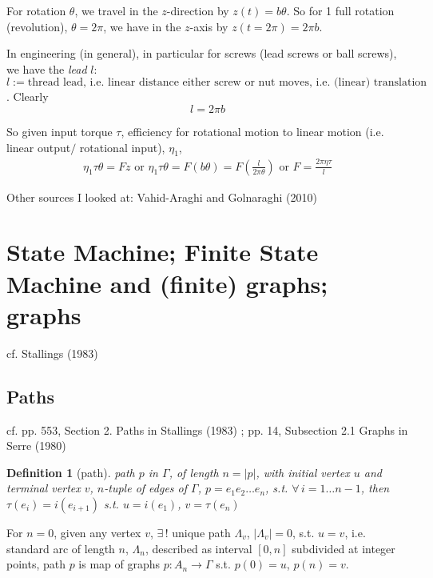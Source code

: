 \documentclass[10pt]{amsart}
\newtheorem{definition}{Definition}
\begin{document}
\begin{multicols*}{2}
For rotation $\theta$, we travel in the $z$-direction by $z(t) =b\theta$.  So for 1 full rotation (revolution), $\theta = 2\pi$, we have in the $z$-axis by $z(t=2\pi) =2\pi b$.  

In engineering (in general), in particular for screws (lead screws or ball screws), we have the \emph{lead} $l$: \\
$l:= \text{thread lead, i.e. linear distance either screw or nut moves, i.e. (linear) translation length (for 1 full rotation (revolution)) }$.  Clearly
\begin{equation}
l = 2\pi b
\end{equation}

So given input torque $\tau$, efficiency for rotational motion to linear motion (i.e. linear output$/$ rotational input), $\eta_1$, 
\begin{equation}
\begin{gathered}
\eta_1 \tau \theta = Fz \text{ or } \eta_1\tau \theta = F(b\theta) = F \left( \frac{l}{2\pi \theta } \right) \text{ or } \boxed{ F = \frac{2\pi \eta \tau }{l } }
\end{gathered}
\end{equation}

Other sources I looked at: 
Vahid-Araghi and Golnaraghi (2010) \cite{VaGo2010} 



\section{State Machine; Finite State Machine and (finite) graphs; graphs}

cf. Stallings (1983) \cite{Stal1983}

\subsection{Paths}

cf. pp. 553, Section 2. Paths in Stallings (1983) \cite{Stal1983}; pp. 14, Subsection 2.1 Graphs in Serre (1980) \cite{Serr1980}
\begin{definition}[path]
path $p$ in $\Gamma$, of length $n=|p|$, with initial vertex $u$ and terminal vertex $v$, $n$-tuple of edges of $\Gamma$, $p=e_1 e_2 \dots e_n$, s.t. $\forall \, i = 1\dots n-1$, then $\tau(e_i) = i(e_{i+1})$ s.t. $u=i(e_1)$, $v=\tau(e_n)$  

\end{definition}

For $n=0$, given any vertex $v$, $\exists \, !$ unique path $\Lambda_v$, $| \Lambda_v| =0$, s.t. $u=v$, i.e. \\
standard arc of length $n$, $\Lambda_n$, described as interval $[0,n]$ subdivided at integer points, path $p$ is map of graphs $p:A_n \to \Gamma$ s.t. $p(0)=u$, $p(n)=v$.  



\end{multicols*}
\end{document}
